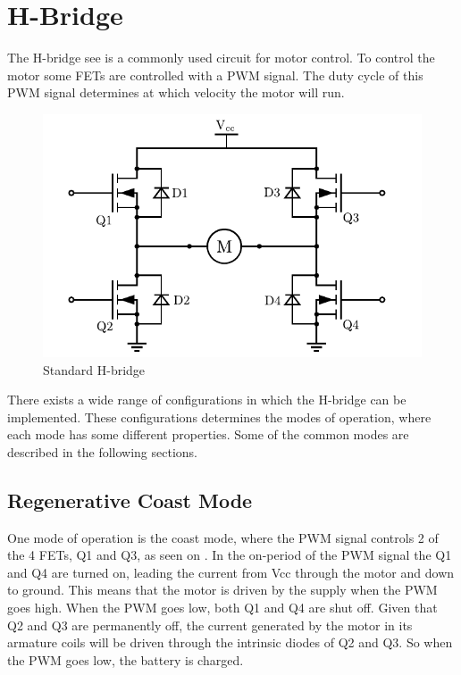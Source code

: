 \section{H-Bridge}\label{sec:HBridge}
The H-bridge see  is a commonly used circuit for motor control. To control the motor some FETs are controlled with a PWM signal. The duty cycle of this PWM signal determines at which velocity the motor will run.

\begin{figure}[H]
	\centering
	\includegraphics[scale=.6]{figures/Hbridge.pdf}
	\caption{Standard H-bridge}
	\label{Hbridge}
\end{figure}

There exists a wide range of configurations in which the H-bridge can be implemented. These configurations determines the modes of operation, where each mode has some different properties. Some of the common modes are described in the following sections.

\subsection{Regenerative Coast Mode}
One mode of operation is the coast mode, where the PWM signal controls 2 of the 4 FETs, Q1 and Q3, as seen on . In the on-period of the PWM signal the Q1 and Q4 are turned on, leading the current from Vcc through the motor and down to ground. This means that the motor is driven by the supply when the PWM goes high. When the PWM goes low, both Q1 and Q4 are shut off. Given that Q2 and Q3 are permanently off, the current generated by the motor in its armature coils will be driven through the intrinsic diodes of Q2 and Q3. So when the PWM goes low, the battery is charged.

